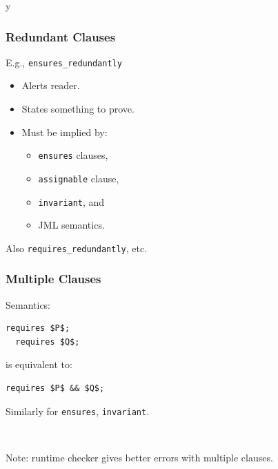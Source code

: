 \if y\MAKEHANDOUTS \documentclass[t,compress,landscape,handout]{beamer}
\begin{document}
\begin{frame}[fragile,label=redundantly]
\frametitle{Redundant Clauses}

E.g., \lstinline!ensures_redundantly!
\begin{itemize}
\item
Alerts reader.

\item
States something to prove.

\item
Must be implied by:
\begin{itemize}
\item
\lstinline!ensures! clauses,

\item
\lstinline!assignable! clause,

\item
\lstinline!invariant!, and

\item
JML semantics.
\end{itemize}
\end{itemize}

Also \lstinline!requires_redundantly!, etc.

\end{frame}

\begin{frame}[fragile]
\frametitle{Multiple Clauses}

Semantics:

\begin{lstlisting}[mathescape=true]
  requires $P$;
  requires $Q$;
\end{lstlisting}

is equivalent to:

\begin{lstlisting}[mathescape=true]
  requires $P$ && $Q$;
\end{lstlisting}

Similarly for \lstinline!ensures!, \lstinline!invariant!.

~

Note: runtime checker gives better errors with multiple clauses.

\end{frame}
\end{document}
